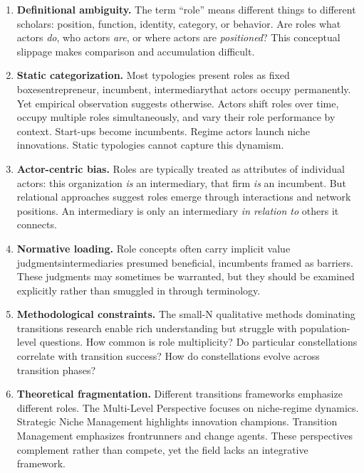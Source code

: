 \documentclass[../main.tex]{subfiles}
\begin{document}
\begin{enumerate}[leftmargin=*, itemsep=0.5em]

\item \textbf{Definitional ambiguity.} The term ``role'' means different things to different scholars: position, function, identity, category, or behavior. Are roles what actors \emph{do}, who actors \emph{are}, or where actors are \emph{positioned}? This conceptual slippage makes comparison and accumulation difficult.

\item \textbf{Static categorization.} Most typologies present roles as fixed boxes\textemdash entrepreneur, incumbent, intermediary\textemdash that actors occupy permanently. Yet empirical observation suggests otherwise. Actors shift roles over time, occupy multiple roles simultaneously, and vary their role performance by context. Start-ups become incumbents. Regime actors launch niche innovations. Static typologies cannot capture this dynamism.

\item \textbf{Actor-centric bias.} Roles are typically treated as attributes of individual actors: this organization \emph{is} an intermediary, that firm \emph{is} an incumbent. But relational approaches suggest roles emerge through interactions and network positions. An intermediary is only an intermediary \emph{in relation to} others it connects.

\item \textbf{Normative loading.} Role concepts often carry implicit value judgments\textemdash intermediaries presumed beneficial, incumbents framed as barriers. These judgments may sometimes be warranted, but they should be examined explicitly rather than smuggled in through terminology.

\item \textbf{Methodological constraints.} The small-N qualitative methods dominating transitions research enable rich understanding but struggle with population-level questions. How common is role multiplicity? Do particular constellations correlate with transition success? How do constellations evolve across transition phases?

\item \textbf{Theoretical fragmentation.} Different transitions frameworks emphasize different roles. The Multi-Level Perspective focuses on niche-regime dynamics. Strategic Niche Management highlights innovation champions. Transition Management emphasizes frontrunners and change agents. These perspectives complement rather than compete, yet the field lacks an integrative framework.

\end{enumerate}
\end{document}
